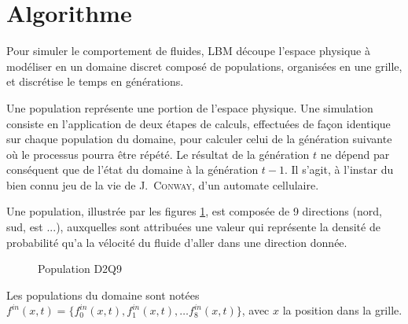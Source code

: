 
\section{Algorithme} \label{title-lbm_algo}
Pour simuler le comportement de fluides, \acs{LBM} découpe l'espace physique à modéliser en un domaine discret composé de populations, organisées en une grille, et discrétise le temps en générations. 

Une population représente une portion de l'espace physique. Une simulation consiste en l'application de deux étapes de calculs, effectuées de façon identique sur chaque population du domaine, pour calculer celui de la génération suivante où le processus pourra être répété. Le résultat de la génération $t$ ne dépend par conséquent que de l'état du domaine à la génération $t-1$.  Il s'agit, à l'instar du bien connu jeu de la vie de \textsc{J.~Conway}, d'un automate cellulaire.


Une population, illustrée par les figures \ref{fig:population_d2q9}, est composée de 9 directions (nord, sud, est ...), auxquelles sont attribuées une valeur qui représente la densité de probabilité qu'a la vélocité du fluide d'aller dans une direction donnée.

\begin{figure}[h]
	\centering
	\caption{Population D2Q9}
	\label{fig:population_d2q9}
\end{figure}
Les populations du domaine sont notées $f^{in}(x,t) = \{f^{in}_0(x,t), f^{in}_1(x,t), \dots f^{in}_8(x,t)\}$, avec $x$ la position dans la grille.

